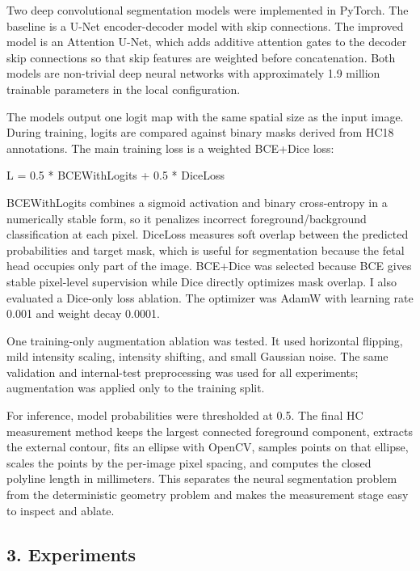 \documentclass[
  10pt,
]{article}
\newenvironment{Shaded}{}{}
\newcommand{\NormalTok}[1]{#1}
\begin{document}
Two deep convolutional segmentation models were implemented in PyTorch.
The baseline is a U-Net encoder-decoder model with skip connections. The
improved model is an Attention U-Net, which adds additive attention
gates to the decoder skip connections so that skip features are weighted
before concatenation. Both models are non-trivial deep neural networks
with approximately 1.9 million trainable parameters in the local
configuration.

The models output one logit map with the same spatial size as the input
image. During training, logits are compared against binary masks derived
from HC18 annotations. The main training loss is a weighted BCE+Dice
loss:

\begin{Shaded}
\begin{Highlighting}[]
\NormalTok{L = 0.5 * BCEWithLogits + 0.5 * DiceLoss}
\end{Highlighting}
\end{Shaded}

BCEWithLogits combines a sigmoid activation and binary cross-entropy in
a numerically stable form, so it penalizes incorrect
foreground/background classification at each pixel. DiceLoss measures
soft overlap between the predicted probabilities and target mask, which
is useful for segmentation because the fetal head occupies only part of
the image. BCE+Dice was selected because BCE gives stable pixel-level
supervision while Dice directly optimizes mask overlap. I also evaluated
a Dice-only loss ablation. The optimizer was AdamW with learning rate
0.001 and weight decay 0.0001.

One training-only augmentation ablation was tested. It used horizontal
flipping, mild intensity scaling, intensity shifting, and small Gaussian
noise. The same validation and internal-test preprocessing was used for
all experiments; augmentation was applied only to the training split.

For inference, model probabilities were thresholded at 0.5. The final HC
measurement method keeps the largest connected foreground component,
extracts the external contour, fits an ellipse with OpenCV, samples
points on that ellipse, scales the points by the per-image pixel
spacing, and computes the closed polyline length in millimeters. This
separates the neural segmentation problem from the deterministic
geometry problem and makes the measurement stage easy to inspect and
ablate.

\subsection{3. Experiments}\label{experiments}
\end{document}
